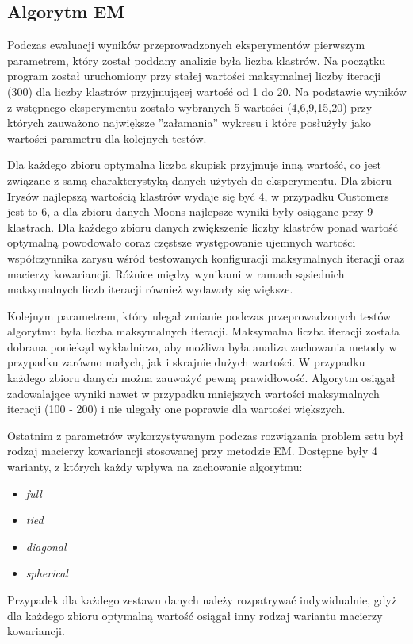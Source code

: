 \documentclass{classrep}
\begin{document}
{        \subsection{Algorytm EM}
        \label{summary_3} {
            Podczas ewaluacji wyników przeprowadzonych eksperymentów pierwszym parametrem, który został poddany analizie była liczba klastrów. Na początku program został uruchomiony przy stałej wartości maksymalnej liczby iteracji (300) dla liczby klastrów przyjmującej wartość od 1 do 20. Na podstawie wyników z wstępnego eksperymentu zostało wybranych 5 wartości (4,6,9,15,20) przy których zauważono największe ''załamania'' wykresu i które posłużyły jako wartości parametru dla kolejnych testów.
            
            Dla każdego zbioru optymalna liczba skupisk przyjmuje inną wartość, co jest związane z samą charakterystyką danych użytych do eksperymentu. Dla zbioru Irysów najlepszą wartością klastrów wydaje się być 4, w przypadku Customers jest to 6, a dla zbioru danych Moons najlepsze wyniki były osiągane przy 9 klastrach. Dla każdego zbioru danych zwiększenie liczby klastrów ponad wartość optymalną powodowało coraz częstsze występowanie ujemnych wartości współczynnika zarysu wśród testowanych konfiguracji maksymalnych iteracji oraz macierzy kowariancji. Różnice między wynikami w ramach sąsiednich maksymalnych liczb iteracji również wydawały się większe.
            
            Kolejnym parametrem, który ulegał zmianie podczas przeprowadzonych testów algorytmu była liczba maksymalnych iteracji. Maksymalna liczba iteracji została dobrana poniekąd wykładniczo, aby możliwa była analiza zachowania metody w przypadku zarówno małych, jak i skrajnie dużych wartości. W przypadku każdego zbioru danych można zauważyć pewną prawidłowość. Algorytm osiągał zadowalające wyniki nawet w przypadku mniejszych wartości maksymalnych iteracji (100 - 200) i nie ulegały one poprawie dla wartości większych.
            
            Ostatnim z parametrów wykorzystywanym podczas rozwiązania problem setu był rodzaj macierzy kowariancji stosowanej przy metodzie EM. Dostępne były 4 warianty, z których każdy wpływa na zachowanie algorytmu:
            \begin{itemize}
                \item \textit{full}
                \item \textit{tied}
                \item \textit{diagonal}
                \item \textit{spherical}
            \end{itemize}
            Przypadek dla każdego zestawu danych należy rozpatrywać indywidualnie, gdyż dla każdego zbioru optymalną wartość osiągał inny rodzaj wariantu macierzy kowariancji.
        }

}
\end{document}
